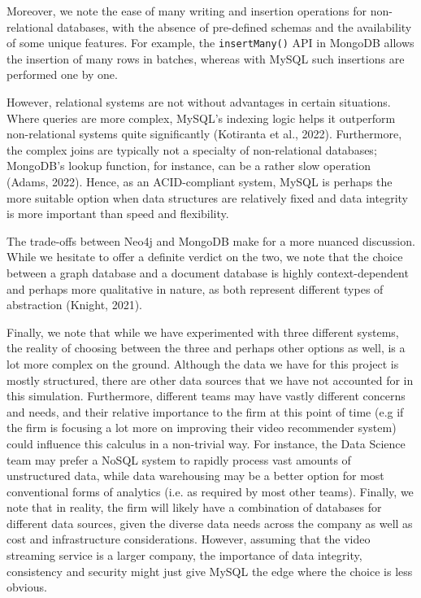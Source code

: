 \documentclass[10pt,titlepage]{article}
\begin{document}
Moreover, we note the ease of many writing and insertion operations for non-relational databases, with the absence of pre-defined schemas and the availability of some unique features. For example, the \texttt{insertMany()} API in MongoDB allows the insertion of many rows in batches, whereas with MySQL such insertions are performed one by one.

However, relational systems are not without advantages in certain situations. Where queries are more complex, MySQL's indexing logic helps it outperform non-relational systems quite significantly (Kotiranta et al., 2022). Furthermore, the complex joins are typically not a specialty of non-relational databases; MongoDB's lookup function, for instance, can be a rather slow operation (Adams, 2022). Hence, as an ACID-compliant system, MySQL is perhaps the more suitable option when data structures are relatively fixed and data integrity is more important than speed and flexibility.

The trade-offs between Neo4j and MongoDB make for a more nuanced discussion. While we hesitate to offer a definite verdict on the two, we note that the choice between a graph database and a document database is highly context-dependent and perhaps more qualitative in nature, as both represent different types of abstraction (Knight, 2021). 

Finally, we note that while we have experimented with three different systems, the reality of choosing between the three and perhaps other options as well, is a lot more complex on the ground. Although the data we have for this project is mostly structured, there are other data sources that we have not accounted for in this simulation. Furthermore, different teams may have vastly different concerns and needs, and their relative importance to the firm at this point of time (e.g if the firm is focusing a lot more on improving their video recommender system) could influence this calculus in a non-trivial way. For instance, the Data Science team may prefer a NoSQL system to rapidly process vast amounts of unstructured data, while data warehousing may be a better option for most conventional forms of analytics (i.e. as required by most other teams). Finally, we note that in reality, the firm will likely have a combination of databases for different data sources, given the diverse data needs across the company as well as cost and infrastructure considerations. However, assuming that the video streaming service is a larger company, the importance of data integrity, consistency and security might just give MySQL the edge where the choice is less obvious.
\end{document}
